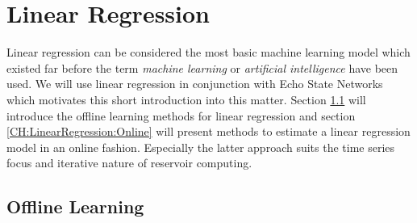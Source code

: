 \section{Linear Regression}
\label{CH:LinearRegression}

Linear regression can be considered the most basic machine learning model which existed far before the term \textit{machine learning} or \textit{artificial intelligence} have been used. We will use linear regression in conjunction with Echo State Networks which motivates this short introduction into this matter. Section \ref{CH:LinearRegression:Offline} will introduce the offline learning methods for linear regression and section \ref{CH:LinearRegression:Online} will present methods to estimate a linear regression model in an online fashion. Especially the latter approach suits the time series focus and iterative nature of reservoir computing.

\subsection{Offline Learning}
\label{CH:LinearRegression:Offline}


